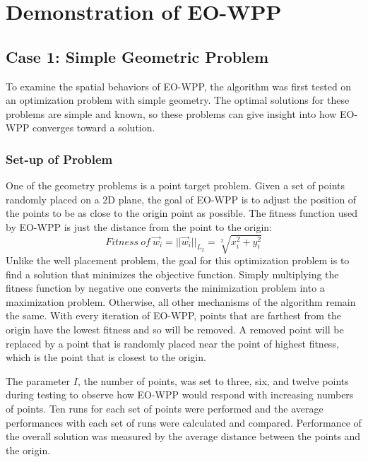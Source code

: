 \documentclass[authoryear]{elsarticle}
\begin{document}
\section{Demonstration of EO-WPP}
\subsection{Case 1: Simple Geometric Problem}
To examine the spatial behaviors of EO-WPP, the algorithm was first tested on an optimization problem with simple geometry. The optimal solutions for these problems are simple and known, so these problems can give insight into how EO-WPP converges toward a solution.
\subsubsection{Set-up of Problem}
 One of the geometry problems is a point target problem. Given a set of points randomly placed on a 2D plane, the goal of EO-WPP is to adjust the position of the points to be as close to the origin point as possible. The fitness function used by EO-WPP is just the distance from the point to the origin:
\begin{equation}\label{PointProbFitFunc}
  Fitness\ of\ \vec{w}_{i} = ||\vec{w}_{i}||_{L_{2}} = \sqrt[2]{x_{i}^{2}+y_{i}^{2}}
\end{equation}
Unlike the well placement problem, the goal for this optimization problem is to find a solution that minimizes the objective function. Simply multiplying the fitness function by negative one converts the minimization problem into a maximization problem. Otherwise, all other mechanisms of the algorithm remain the same. With every iteration of EO-WPP, points that are farthest from the origin have the lowest fitness and so will be removed. A removed point will be replaced by a point that is randomly placed near the point of highest fitness, which is the point that is closest to the origin.   

The parameter $I$, the number of points, was set to three, six, and twelve points during testing to observe how EO-WPP would respond with increasing numbers of points. Ten runs for each set of points were performed and the average performances with each set of runs were calculated and compared. Performance of the overall solution was measured by the average distance between the points and the origin.
\end{document}
